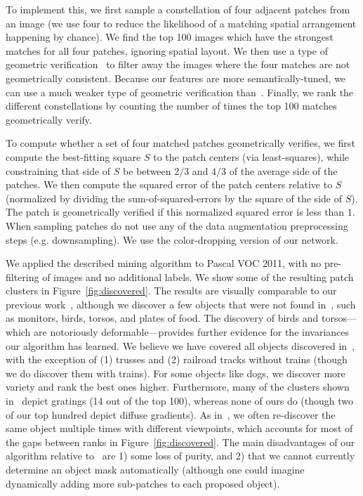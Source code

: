 \documentclass[10pt,twocolumn,letterpaper]{article}
\begin{document}
To implement this, we first sample a constellation of four adjacent patches from an image (we use four to reduce the likelihood of a matching spatial arrangement happening by chance). 
We find the top 100 images which have the strongest matches for all four patches, ignoring spatial layout. 
We then use a type of geometric verification~\cite{chum2007total} to filter away the images where the four matches are not geometrically consistent.
Because our features are more semantically-tuned, we can use a much weaker type of geometric verification than~\cite{chum2007total}.  
Finally, we rank the different constellations by counting the number of times the top 100 matches geometrically verify.








 To compute whether a set of four matched patches geometrically verifies, we first compute the best-fitting square $S$ to the patch centers (via least-squares), while constraining that side of $S$ be between $2/3$ and $4/3$ of the average side of the patches.  We then compute the squared error of the patch centers relative to $S$ (normalized by dividing the sum-of-squared-errors by the square of the side of $S$).  The patch is geometrically verified if this normalized squared error is less than $1$.  When sampling patches do not use any of the data augmentation preprocessing steps (e.g. downsampling).  We use the color-dropping version of our network. 

We applied the described mining algorithm to Pascal VOC 2011, with no pre-filtering of images and no additional labels.
We show some of the resulting patch clusters in Figure~\ref{fig:discovered}.  The results are visually comparable to our previous work~\cite{doersch2014context}, although we discover a few objects that were not found in~\cite{doersch2014context}, such as monitors, birds, torsos, and plates of food.  The discovery of birds and torsos---which are notoriously deformable---provides further evidence for the invariances our algorithm has learned.  
We believe we have covered all objects discovered in~\cite{doersch2014context}, with the exception of (1) trusses and (2) railroad tracks without trains (though we do discover them with trains).  For some objects like dogs, we discover more variety and rank the best ones higher.  Furthermore, many of the clusters shown in~\cite{doersch2014context} depict gratings (14 out of the top 100), whereas none of ours do (though two of our top hundred depict diffuse gradients).  As in~\cite{doersch2014context}, we often re-discover the same object multiple times with different viewpoints, which accounts for most of the gaps between ranks in Figure~\ref{fig:discovered}.  The main disadvantages of our algorithm relative to~\cite{doersch2014context} are 1) some loss of purity, and 2) that we cannot currently determine an object mask automatically (although one could imagine dynamically adding more sub-patches to each proposed object).%
\end{document}
